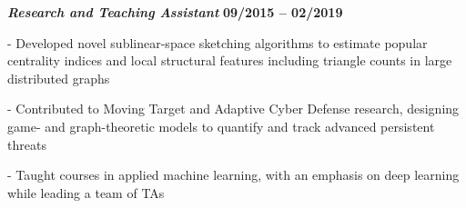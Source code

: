 \documentclass[10pt]{article}
\newcommand{\halfblankline}{\quad\vspace{-0.5\baselineskip}\pagebreak[3]}
\begin{document}
\begin{outerlist}

\item[] \textbf{\textit{Research and Teaching Assistant}}%
\hfill \textbf{09/2015 -- 02/2019}

\begin{innerlist}

\item[-] Developed novel sublinear-space sketching algorithms to estimate popular centrality indices and local structural features including triangle counts in large distributed graphs 

\item[-] Contributed to Moving Target and Adaptive Cyber Defense research, designing game- and graph-theoretic models to quantify and track advanced persistent threats

\item[-] Taught courses in applied machine learning, with an emphasis on deep learning while leading a team of TAs

\end{innerlist}
\end{outerlist}






\halfblankline



%
%
%
%
%
%
%
%
%
%
%
%
%
%
%
\end{document}
